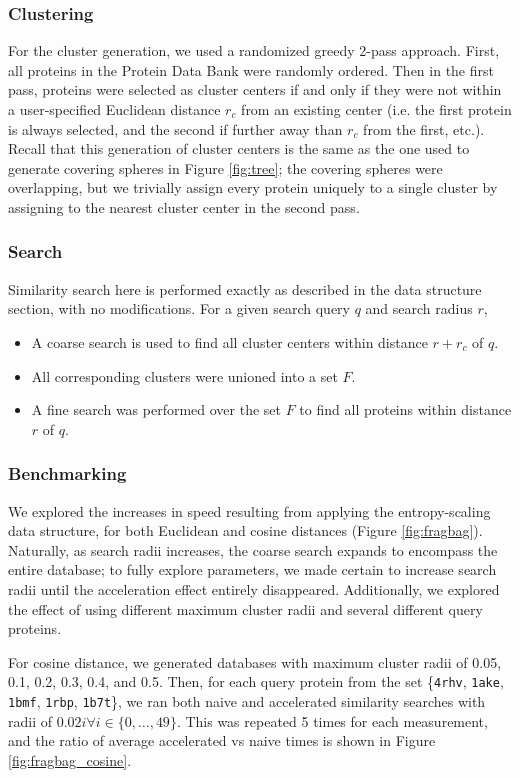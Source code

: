 \documentclass[review,preprint,12pt]{elsarticle}
\theoremstyle{definition}
\theoremstyle{remark}
\numberwithin{equation}{section}
\begin{document}
\subsubsection{Clustering}
For the cluster generation, we used a randomized greedy 2-pass approach.
First, all proteins in the Protein Data Bank were randomly ordered.
Then in the first pass, proteins were selected as cluster centers if and only if they were not within a user-specified Euclidean distance $r_c$ from an existing center (i.e. the first protein is always selected, and the second if further away than $r_c$ from the first, etc.).
Recall that this generation of cluster centers is the same as the one used to generate covering spheres in Figure \ref{fig:tree};
the covering spheres were overlapping, but we trivially assign every protein uniquely to a single cluster by assigning to the nearest cluster center in the second pass.

\subsubsection{Search}
Similarity search here is performed exactly as described in the data structure section, with no modifications.
For a given search query $q$ and search radius $r$,
\begin{itemize}
    \item A coarse search is used to find all cluster centers within distance $r+r_c$ of $q$.
    \item All corresponding clusters were unioned into a set $F$.
    \item A fine search was performed over the set $F$ to find all proteins within distance $r$ of $q$.
\end{itemize}

\subsubsection{Benchmarking}
We explored the increases in speed resulting from applying the entropy-scaling data structure, for both Euclidean and cosine distances (Figure \ref{fig:fragbag}).
Naturally, as search radii increases, the coarse search expands to encompass the entire database; to fully explore parameters, we made certain to increase search radii until the acceleration effect entirely disappeared.
Additionally, we explored the effect of using different maximum cluster radii and several different query proteins.

For cosine distance, we generated databases with maximum cluster radii of 0.05, 0.1, 0.2, 0.3, 0.4, and 0.5.
Then, for each query protein from the set \{\texttt{4rhv}, \texttt{1ake}, \texttt{1bmf}, \texttt{1rbp}, \texttt{1b7t}\}, we ran both naive and accelerated similarity searches with radii of $0.02i \forall i \in \{0,\ldots,49\}$.
This was repeated 5 times for each measurement, and the ratio of average accelerated vs naive times is shown in Figure \ref{fig:fragbag_cosine}.
\end{document}
